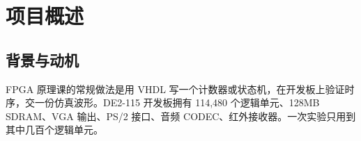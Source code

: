 \documentclass{SYSUReport}
\date{2026年6月}
\begin{document}
\cover
\thispagestyle{empty}
\clearpage

\begin{abstract}

本项目在 Altera DE2-115 开发板~\cite{de2115}（Cyclone IV E, EP4CE115F29C7）上构建了一台完整的 RISC-V 计算机。
以 NEORV32 软核处理器~\cite{neorv32}为核心，通过 Wishbone 总线~\cite{wishbone}连接 12 个自定义外设（SDRAM 控制器、VGA 文本/像素终端、PS/2 键盘、音频合成器、GPU 2D 加速器等），
运行 FreeRTOS 实时操作系统~\cite{freertos}，通过 UART bootloader 从 SDRAM 执行用户固件。

系统提供 20 条 shell 命令，包括：硬件加速的 Conway 生命游戏~\cite{conway1970game}、Snake 双人游戏、TWM 像素窗口管理器、AES/SHA/SM4 密码学基准测试、NTT 数论变换加速器、
13 个课程实验的硬件多路复用器、RISC-V 汇编监视器等。所有交互式程序统一 F1 帮助 / F10 退出操作逻辑。

项目历时 12 天、110 余次提交，覆盖 RTL 设计、固件开发、RTOS 移植、硬件加速器设计。

\end{abstract}
\thispagestyle{empty}
\clearpage

\setcounter{page}{1}
\tableofcontents
\clearpage

\setcounter{page}{1}

\section{项目概述}

\subsection{背景与动机}

FPGA 原理课的常规做法是用 VHDL 写一个计数器或状态机，在开发板上验证时序，交一份仿真波形。DE2-115 开发板拥有 114,480 个逻辑单元、128MB SDRAM、VGA 输出、PS/2 接口、音频 CODEC、红外接收器。一次实验只用到其中几百个逻辑单元。
\end{document}
